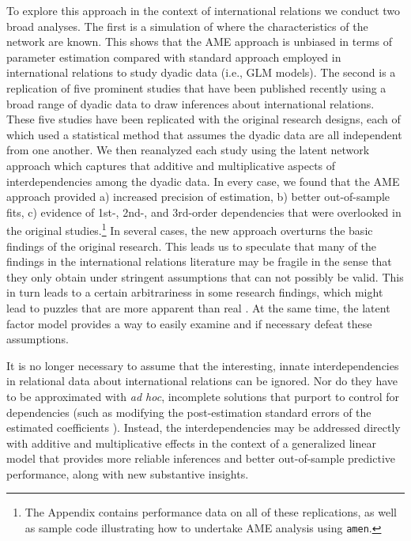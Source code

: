To explore this approach in the context of international relations we conduct two broad analyses. The first is a simulation of where the characteristics of the network are known. This shows that the AME approach is unbiased in terms of parameter estimation compared with standard approach employed in
international relations to study dyadic data (i.e., GLM models). The second is a replication of five prominent studies that have been published recently using a broad range of dyadic data to draw inferences about international relations.  These five studies have been replicated with the original research designs, each of which used a statistical method that assumes the dyadic data are all independent from one another.  We then reanalyzed each study using the latent network approach which captures that additive and multiplicative aspects of interdependencies among the dyadic data.  In every case, we found that the AME approach provided a) increased precision of estimation, b) better out-of-sample fits, c) evidence of 1st-, 2nd-, and 3rd-order dependencies that were overlooked in the original studies.\footnote{The Appendix contains performance data on all of these replications, as well as sample code illustrating how to undertake AME analysis using \texttt{amen}.} In several cases, the new approach overturns the basic findings of the original research.  This leads us to speculate that many of the findings in the international relations literature may be fragile in the sense that they only obtain under stringent assumptions that can not possibly be valid.  This in turn leads to a certain arbitrariness in some research findings, which might lead to puzzles that are more apparent than real \citep{zinnes:1980}.  At the same time, the latent factor model provides a way to easily examine and if necessary defeat these assumptions.

It is no longer necessary to assume that the interesting, innate interdependencies in relational data about international relations can be ignored. Nor do they have to be approximated with \textit{ad hoc}, incomplete solutions that purport to control for dependencies (such as modifying the post-estimation standard errors of the estimated coefficients \citep{king:roberts:2014}). Instead, the interdependencies may be addressed directly with additive and multiplicative effects in the context of a generalized linear model that provides more reliable inferences and better out-of-sample predictive performance, along with new substantive insights. 